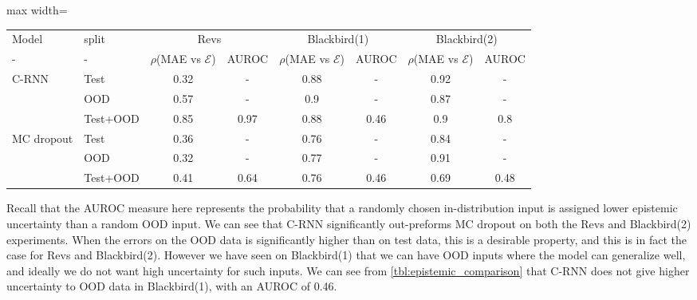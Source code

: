 \documentclass[../main.tex]{subfiles}
\begin{document}
\begin{table*}[htbp]
\centering
\begin{adjustbox}{max width=\textwidth}
    \begin{tabular}{l l c c c c c c}  
        \toprule
        Model & split & \multicolumn{2}{c}{Revs} & \multicolumn{2}{c}{Blackbird(1)} & \multicolumn{2}{c}{Blackbird(2)}\\
        - & - & $\rho$(MAE vs $\mathcal{E}$) & AUROC &
        $\rho$(MAE vs $\mathcal{E}$) & AUROC & $\rho$(MAE vs $\mathcal{E}$)  & AUROC \\
        \midrule
        \multirow{3}{*}{C-RNN} 
            & Test     & 0.32 & -    & 0.88 & -    & 0.92 & -   \\  
            & OOD      & 0.57 & -    & 0.9  & -    & 0.87 & -   \\  
            & Test+OOD & 0.85 & 0.97 & 0.88 & 0.46 & 0.9  & 0.8 \\ 

        \midrule
        \multirow{3}{*}{MC dropout} 
            & Test     & 0.36 & -    & 0.76  & -    & 0.84 & -  \\  
            & OOD      & 0.32 & -    & 0.77  & -    & 0.91  &  -  \\  
            & Test+OOD & 0.41 & 0.64 & 0.76  & 0.46 & 0.69 & 0.48 \\ 
        
        \toprule
    \end{tabular}
\end{adjustbox}
    \caption[Epistemic uncertainty comparison]{Epistemic uncertainty comparison. We show the Pearson correlation with the MAE, and the AUROC.  }
    \label{tbl:epistemic_comparison}
\end{table*}

Recall that the AUROC measure here represents the probability that a randomly chosen in-distribution input is assigned lower epistemic uncertainty than a random OOD input. We can see that C-RNN significantly out-preforms MC dropout on both the Revs and Blackbird(2) experiments. When the errors on the OOD data is significantly higher than on test data, this is a desirable property, and this is in fact the case for Revs and Blackbird(2). However we have seen on Blackbird(1) that we can have OOD inputs where the model can generalize well, and ideally we do not want high uncertainty for such inputs. We can see from \cref{tbl:epistemic_comparison} that C-RNN does not give higher uncertainty to OOD data in Blackbird(1), with an AUROC of 0.46. 
\end{document}
